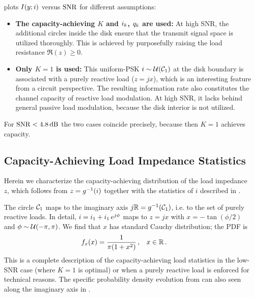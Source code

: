  plots $I(y;i)$ versus $\mathrm{SNR}$ for different assumptions:
\begin{itemize}
\item \textbf{The capacity-achieving $K$ and $i_k$, $q_k$ are used:} At high SNR, the additional circles inside the disk ensure that the transmit signal space is utilized thoroughly. %
This is achieved by purposefully raising the load resistance $\Re(z) \geq 0$.
\item \textbf{Only $K = 1$ is used:} This uniform-PSK $i \sim \mathcal{U}(\mathcal{C}_1)$ at the disk boundary is associated with a purely reactive load ($z = jx$), which is an interesting feature from a circuit perspective. The resulting information rate also constitutes the channel capacity of reactive load modulation. At high SNR, it lacks behind general passive load modulation, because the disk interior is not utilized.
\end{itemize}
For $\mathrm{SNR} < 4.8\,\mathrm{dB}$ the two cases coincide precisely, because then $K=1$ achieves capacity.

\subsection{Capacity-Achieving Load Impedance Statistics}
\label{sec:loadstats}

Herein we characterize the capacity-achieving distribution of the load impedance $z$, which follows from $z = g^{-1}(i)$ together with the statistics of $i$ described in .

The circle $\mathcal{C}_1$ maps to the imaginary axis $j\mathbb{R} = g^{-1}(\mathcal{C}_1)$, i.e. to the set of purely reactive loads.
In detail, $i = i_1 + i_1\, e^{j\phi}$ maps to $z = jx$ with
$x = -\tan(\phi / 2)$ and $\phi \sim \mathcal{U}(-\pi,\pi)$. We find that $x$ has standard Cauchy distribution; the PDF is
\begin{align}
f_x(x) &= \frac{1}{\pi(1 + x^2)} \, , &
x &\in \mathbb{R} \, . &
\label{eq:Lorentz}
\end{align}
This is a complete description of the capacity-achieving load statistics in the low-SNR case (where $K = 1$ is optimal) or when a purely reactive load is enforced for technical reasons. The specific probability density evolution from  can also seen along the imaginary axis in .

